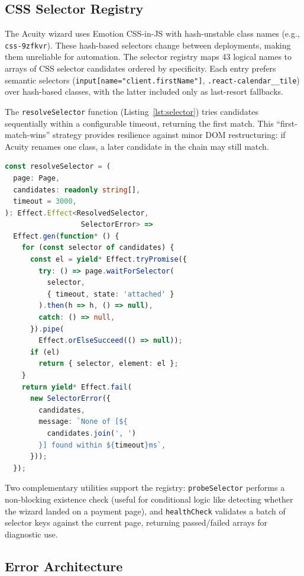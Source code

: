 \documentclass[conference]{IEEEtran}
\begin{document}
\subsection{CSS Selector Registry}

The Acuity wizard uses Emotion CSS-in-JS with hash-unstable class names (e.g., \texttt{css-9zfkvr}). These hash-based selectors change between deployments, making them unreliable for automation. The selector registry maps 43 logical names to arrays of CSS selector candidates ordered by specificity. Each entry prefers semantic selectors (\texttt{input[name="client.firstName"]}, \texttt{.react-calendar\_\_tile}) over hash-based classes, with the latter included only as last-resort fallbacks.

The \texttt{resolveSelector} function (Listing~\ref{lst:selector}) tries candidates sequentially within a configurable timeout, returning the first match. This ``first-match-wins'' strategy provides resilience against minor DOM restructuring: if Acuity renames one class, a later candidate in the chain may still match.

\begin{lstlisting}[language=TypeScript,caption={Fallback-chain selector resolution},label={lst:selector}]
const resolveSelector = (
  page: Page,
  candidates: readonly string[],
  timeout = 3000,
): Effect.Effect<ResolvedSelector,
                  SelectorError> =>
  Effect.gen(function* () {
    for (const selector of candidates) {
      const el = yield* Effect.tryPromise({
        try: () => page.waitForSelector(
          selector,
          { timeout, state: 'attached' }
        ).then(h => h, () => null),
        catch: () => null,
      }).pipe(
        Effect.orElseSucceed(() => null));
      if (el)
        return { selector, element: el };
    }
    return yield* Effect.fail(
      new SelectorError({
        candidates,
        message: `None of [${
          candidates.join(', ')
        }] found within ${timeout}ms`,
      }));
  });
\end{lstlisting}

Two complementary utilities support the registry: \texttt{probeSelector} performs a non-blocking existence check (useful for conditional logic like detecting whether the wizard landed on a payment page), and \texttt{healthCheck} validates a batch of selector keys against the current page, returning passed/failed arrays for diagnostic use.

\subsection{Error Architecture}
\end{document}

